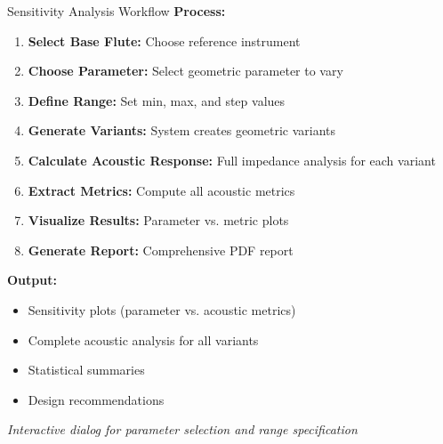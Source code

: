 \documentclass[aspectratio=169,10pt]{beamer}
\begin{document}
\begin{frame}{Sensitivity Analysis Workflow}
\textbf{Process:}

\begin{enumerate}
    \item \textbf{Select Base Flute:} Choose reference instrument
    \item \textbf{Choose Parameter:} Select geometric parameter to vary
    \item \textbf{Define Range:} Set min, max, and step values
    \item \textbf{Generate Variants:} System creates geometric variants
    \item \textbf{Calculate Acoustic Response:} Full impedance analysis for each variant
    \item \textbf{Extract Metrics:} Compute all acoustic metrics
    \item \textbf{Visualize Results:} Parameter vs. metric plots
    \item \textbf{Generate Report:} Comprehensive PDF report
\end{enumerate}

\textbf{Output:}
\begin{itemize}
    \item Sensitivity plots (parameter vs. acoustic metrics)
    \item Complete acoustic analysis for all variants
    \item Statistical summaries
    \item Design recommendations
\end{itemize}

\vspace{0.3cm}
\textit{Interactive dialog for parameter selection and range specification}
\end{frame}
\end{document}
